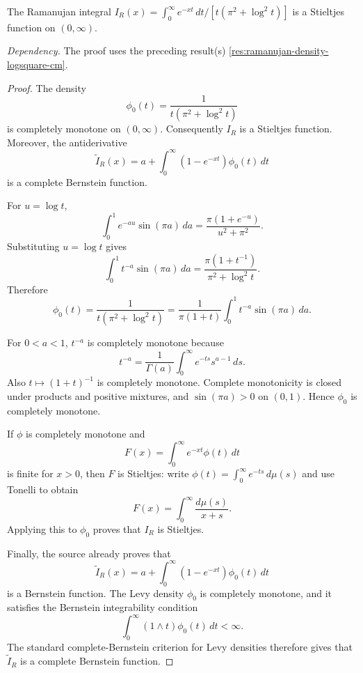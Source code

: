 \begin{proposition}
\label{res:ramanujan-integral-stieltjes}
The Ramanujan integral \(I_R(x)=\int_0^\infty e^{-xt}\,dt/[t(\pi^2+\log^2 t)]\) is a Stieltjes function on \((0,\infty)\).

\emph{Dependency.} The proof uses the preceding result(s) \ref{res:ramanujan-density-logsquare-cm}.
\end{proposition}
\begin{proof}
The density
\[
\phi_0(t)=\frac{1}{t(\pi^2+\log^2 t)}
\]
is completely monotone on \((0,\infty)\). Consequently \(I_R\) is a Stieltjes function. Moreover, the antiderivative
\[
\widetilde I_R(x)=a+\int_0^\infty (1-e^{-xt})\phi_0(t)\,dt
\]
is a complete Bernstein function.

For \(u=\log t\),
\[
\int_0^1 e^{-au}\sin(\pi a)\,da
=\frac{\pi(1+e^{-u})}{u^2+\pi^2}.
\]
Substituting \(u=\log t\) gives
\[
\int_0^1 t^{-a}\sin(\pi a)\,da
=\frac{\pi(1+t^{-1})}{\pi^2+\log^2 t}.
\]
Therefore
\[
\phi_0(t)
=\frac{1}{t(\pi^2+\log^2 t)}
=\frac{1}{\pi(1+t)}\int_0^1 t^{-a}\sin(\pi a)\,da.
\]

For \(0<a<1\), \(t^{-a}\) is completely monotone because
\[
t^{-a}=\frac1{\Gamma(a)}\int_0^\infty e^{-ts}s^{a-1}\,ds.
\]
Also \(t\mapsto(1+t)^{-1}\) is completely monotone. Complete monotonicity is closed under products and positive mixtures, and \(\sin(\pi a)>0\) on \((0,1)\). Hence \(\phi_0\) is completely monotone.

If \(\phi\) is completely monotone and
\[
F(x)=\int_0^\infty e^{-xt}\phi(t)\,dt
\]
is finite for \(x>0\), then \(F\) is Stieltjes: write \(\phi(t)=\int_0^\infty e^{-ts}\,d\mu(s)\) and use Tonelli to obtain
\[
F(x)=\int_0^\infty\frac{d\mu(s)}{x+s}.
\]
Applying this to \(\phi_0\) proves that \(I_R\) is Stieltjes.

Finally, the source already proves that
\[
\widetilde I_R(x)=a+\int_0^\infty (1-e^{-xt})\phi_0(t)\,dt
\]
is a Bernstein function. The Levy density \(\phi_0\) is completely monotone, and it satisfies the Bernstein integrability condition
\[
\int_0^\infty (1\wedge t)\phi_0(t)\,dt<\infty.
\]
The standard complete-Bernstein criterion for Levy densities therefore gives that \(\widetilde I_R\) is a complete Bernstein function.
\end{proof}
